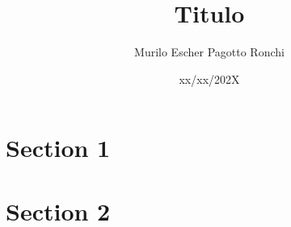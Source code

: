 \documentclass[a4paper, 12pt]{article}
\title{Titulo}
\date{xx/xx/202X}
\author{Murilo Escher Pagotto Ronchi}
\begin{document}
    \maketitle
    \newpage
    \section*{Section 1}

    \section*{Section 2}
\end{document}
